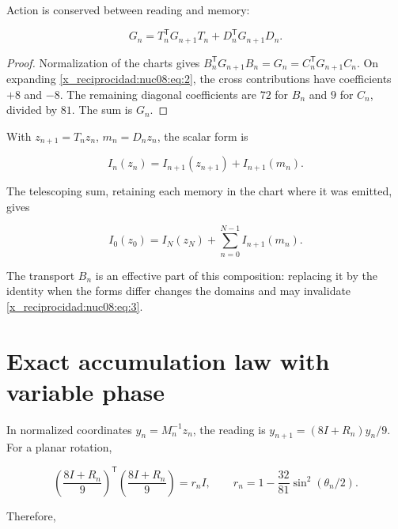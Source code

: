 \begin{theorem}
Action is conserved between reading and memory:

\begin{equation}
\boxed{G_n=T_n^\mathsf TG_{n+1}T_n+D_n^\mathsf TG_{n+1}D_n.}
\label{x_reciprocidad:nuc08:eq:3}
\end{equation}
\end{theorem}

\begin{proof}
Normalization of the charts gives
\(B_n^\mathsf TG_{n+1}B_n=G_n=C_n^\mathsf TG_{n+1}C_n\).
On expanding \eqref{x_reciprocidad:nuc08:eq:2}, the cross contributions have coefficients \(+8\) and \(-8\). The remaining diagonal coefficients are \(72\) for \(B_n\) and \(9\) for \(C_n\), divided by \(81\). The sum is \(G_n\).
\end{proof}

With \(z_{n+1}=T_nz_n\), \(m_n=D_nz_n\), the scalar form is

\begin{equation}
\boxed{I_n(z_n)=I_{n+1}(z_{n+1})+I_{n+1}(m_n).}
\label{x_reciprocidad:nuc08:eq:4}
\end{equation}

The telescoping sum, retaining each memory in the chart where it was emitted, gives

\begin{equation}
I_0(z_0)=I_N(z_N)+\sum_{n=0}^{N-1}I_{n+1}(m_n).
\label{x_reciprocidad:nuc08:eq:5}
\end{equation}

The transport \(B_n\) is an effective part of this composition: replacing it by the identity when the forms differ changes the domains and may invalidate \eqref{x_reciprocidad:nuc08:eq:3}.

\section{Exact accumulation law with variable phase}

In normalized coordinates \(y_n=M_n^{-1}z_n\), the reading is \(y_{n+1}=(8I+R_n)y_n/9\). For a planar rotation,

\begin{equation}
\left(\frac{8I+R_n}{9}\right)^\mathsf T
\left(\frac{8I+R_n}{9}\right)=r_n I,\qquad
r_n=1-\frac{32}{81}\sin^2(\theta_n/2).
\label{x_reciprocidad:nuc08:eq:6}
\end{equation}

Therefore,

